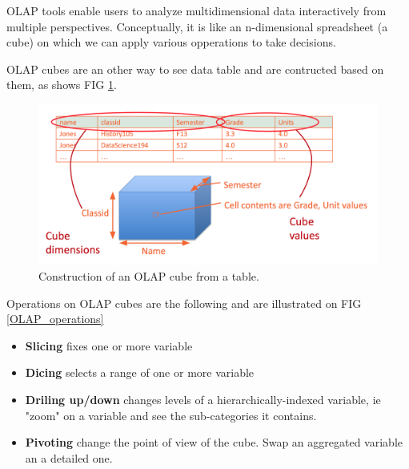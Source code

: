 \documentclass[a4paper,11pt,twoside]{article}
\begin{document}
OLAP tools enable users to analyze multidimensional data interactively from multiple perspectives. Conceptually, it is like an n-dimensional spreadsheet (a cube) on which we can apply various opperations to take decisions.

OLAP cubes are an other way to see data table and are contructed based on them, as shows FIG \ref{OLAP_cubes}.

\begin{figure}%
 \centering
 \includegraphics[width=12cm]{./pic/OLAP_cube}
 \caption{\label{OLAP_cubes} Construction of an OLAP cube from a table.}
\end{figure}

Operations on OLAP cubes are the following and are illustrated on FIG \ref{OLAP_operations}
\begin{itemize}
	\item \textbf{Slicing} fixes one or more variable
	\item \textbf{Dicing} selects a range of one or more variable
	\item \textbf{Driling up/down} changes levels of a hierarchically-indexed variable, ie "zoom" on a variable and see the sub-categories it contains.
	\item \textbf{Pivoting} change the point of view of the cube. Swap an aggregated variable an a detailed one.
\end{itemize}
\end{document}
